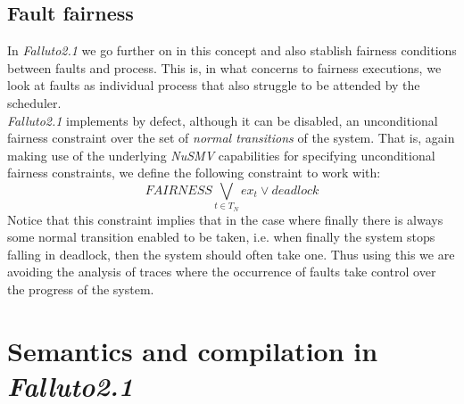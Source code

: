 \documentclass[12pt]{article}
\newcommand{\falluto}{\mbox{\textit{Falluto2.1}}}
\begin{document}
\subsection{Fault fairness}\label{fault fairness}
In \mbox{\textit{Falluto2.1}} we go further on in this concept and also 
stablish fairness conditions between faults and process. This is, in what
concerns to fairness executions, we look at faults as individual process
that also struggle to be attended by the scheduler.\\
\mbox{\textit{Falluto2.1}} implements by defect, although it can be disabled, an unconditional fairness
constraint over the set of \textit{normal transitions} of the system. That
is, again making use of the underlying \mbox{\textit{NuSMV}} capabilities for
specifying unconditional fairness constraints, we define the following
constraint to work with: $$FAIRNESS \bigvee_{t \in T_N} ex_t \vee deadlock$$
Notice that this constraint implies that in the case where finally there is always some
normal transition enabled to be taken, i.e. when finally the system stops falling in deadlock, then the system should often take one.
Thus using this we are avoiding the analysis of traces where the occurrence of faults take
control over the progress of the system. 


\section{Semantics and compilation in \falluto}\label{compilation}
\end{document}
